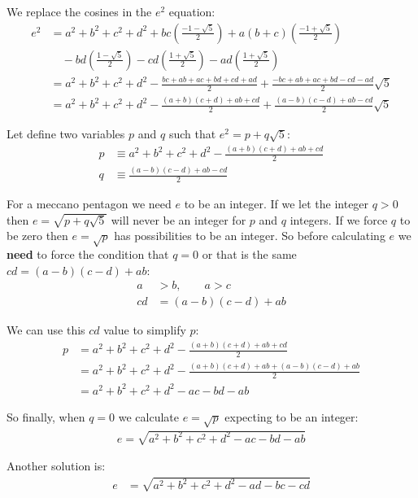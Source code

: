 \documentclass[11pt]{article}
\begin{document}
We replace the cosines in the $e^2$ equation:
\begin{align}
e^2 &= a^2+b^2+c^2+d^2 + bc\left(\frac{-1-\sqrt{5}}{2}\right) + a(b+c)\left(\frac{-1+\sqrt{5}}{2}\right) \nonumber\\
&\quad - bd\left(\frac{1-\sqrt{5}}{2}\right) - cd\left(\frac{1+\sqrt{5}}{2}\right) - ad\left(\frac{1+\sqrt{5}}{2}\right) \nonumber\\
 &= a^2+b^2+c^2+d^2 - \frac{bc+ab+ac+bd+cd+ad}{2} + \frac{-bc+ab+ac+bd-cd-ad}{2}\sqrt{5} \nonumber\\
 &= a^2+b^2+c^2+d^2 - \frac{(a+b)(c+d)+ab+cd}{2} + \frac{(a-b)(c-d)+ab-cd}{2}\sqrt{5}
\end{align}

Let define two variables $p$ and $q$ such that $e^2 = p + q\sqrt{5}$:
\begin{align*}
p &\equiv a^2+b^2+c^2 + d^2 - \frac{(a+b)(c+d)+ab+cd}{2}\\
q &\equiv \frac{(a-b)(c-d) + ab - cd}{2}
\end{align*}

For a meccano pentagon we need $e$ to be an integer. If we let the integer $q > 0$ then $e = \sqrt{p + q\sqrt{5}}$ will never be an integer for $p$ and $q$ integers. If we force $q$ to be zero then $e = \sqrt{p}$ has possibilities to be an integer.
So before calculating $e$ we \textbf{need} to force the condition that $q = 0$ or that is the same $cd = (a-b)(c-d)+ab$:
\begin{align}
a  & > b, \qquad a > c\\
cd &= (a-b)(c-d)+ab
\end{align}

We can use this $cd$ value to simplify $p$:
\begin{align*}
p &= a^2+b^2+c^2+d^2 - \frac{(a+b)(c+d)+ab+cd}{2}\\
  &= a^2+b^2+c^2+d^2 - \frac{(a+b)(c+d)+ab+(a-b)(c-d)+ab}{2}\\
  &= a^2+b^2+c^2+d^2 -ac -bd -ab
\end{align*}

So finally, when $q=0$ we calculate $e = \sqrt{p}$ expecting to be an integer:
\begin{align}
\boxed{ e = \sqrt{a^2 + b^2 + c^2 + d^2 -ac -bd - ab} }
\end{align}

Another solution is:
\begin{align}
e &= \sqrt{a^2 + b^2 + c^2 + d^2 -ad -bc - cd}
\end{align}
\end{document}
